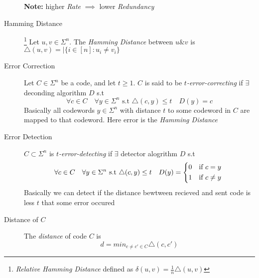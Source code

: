 \begin{description}
        \textbf{Note:} higher \textit{Rate} $\implies$ lower \textit{Redundancy}
    \item[Hamming Distance]
        \footnote{\textit{Relative Hamming Distance} defined as $\delta(u, v) = \frac{1}{n}\triangle(u, v)$}
        Let $u, v \in \Sigma^n$. 
        The \textit{Hamming Distance} between $u \& v$ is $\triangle(u, v) = |\{i \in [n]: u_i \neq v_i\}$
    \item[Error Correction] Let $C \in \Sigma^n$ be a code, and let $t \geq 1$. $C$ is said to be \textit{$t$-error-correcting} if $\exists$ deconding algorithm $D$ s.t
        \[
           \forall c \in C \quad \forall y \in \Sigma^n \text{ s.t } \triangle(c, y) \leq t \quad D(y) = c
        \]
        Basically all codewords $y \in \Sigma^n$ with distance $t$ to some codeword in $C$ are mapped to that codeword. 
        Here error is the \textit{Hamming Distance}
    \item[Error Detection] $C \subset \Sigma^n$ is \textit{$t$-error-detecting} if $\exists$ detector alogrithm $D$ s.t
        \[
            \forall c \in C \quad \forall y \in \Sigma^n \text{ s.t } \triangle(c,y) \leq t \quad D(y) = 
            \begin{cases*}
                0 & if $c = y$ \\
                1 & if $c \neq y$
            \end{cases*}
        \]
        Basically we can detect if the distance bewtween recieved and sent code is less $t$ that some error occured
    \item[Distance of $C$] The \textit{distance} of code $C$ is
        \[
            d = min_{c \neq c' \in C}\triangle(c, c')
        \]
\end{description}
